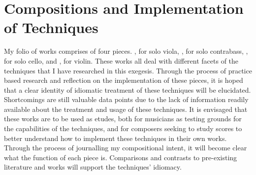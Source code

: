 

\chapter{Compositions and Implementation of Techniques}




My folio of works comprises of four pieces. , for solo viola, , for solo contrabass, , for solo cello, and , for violin. 
These works all deal with different facets of the techniques that I have researched in this exegesis. 
Through the process of practice based research and reflection on the implementation of these pieces, it is hoped that a clear identity of idiomatic treatment of these techniques will be elucidated.
Shortcomings are still valuable data points due to the lack of information readily available about the treatment and usage of these techniques.
It is envisaged that these works are to be used as etudes, both for musicians as testing grounds for the capabilities of the techniques, and for composers seeking to study scores to better understand how to implement these techniques in their own works.
Through the process of journalling my compositional intent, it will become clear what the function of each piece is.
Comparisons and contrasts to pre-existing literature and works will support the techniques' idiomacy. 


